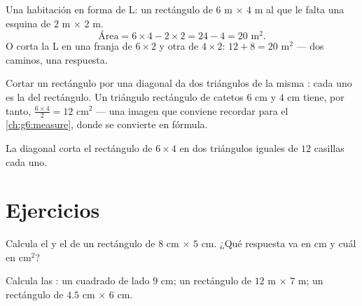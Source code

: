 \begin{example}\label{ex:g5:areas:composite}
Una habitación en forma de L: un rectángulo de $6$ m $\times$ $4$ m al que le falta una
esquina de $2$ m $\times$ $2$ m.
\[
\text{Área} = 6 \times 4 - 2 \times 2 = 24 - 4 = 20 \text{ m}^2 .
\]
O corta la L en una franja de $6 \times 2$ y otra de $4 \times 2$:
$12 + 8 = 20$ m$^2$ --- dos caminos, una respuesta.
\end{example}

\begin{example}\label{ex:g5:areas:halfrect}
Cortar un rectángulo por una diagonal da dos triángulos de la misma
: cada uno es la \emph{} del rectángulo. Un triángulo rectángulo de catetos
$6$ cm y $4$ cm tiene, por tanto,  $\frac{6 \times 4}{2} = 12$
cm$^2$ --- una imagen que conviene recordar para el
\cref{ch:g6:measure}, donde se convierte en fórmula.
\end{example}

\begin{omfigure}

{\small La diagonal corta el rectángulo de $6 \times 4$ en dos triángulos
iguales de $12$ casillas cada uno.}
\end{omfigure}

\section{Ejercicios}

\begin{exercise}[$\star$]\label{exo:g5:areas:1}
Calcula el  y el  de un rectángulo de $8$ cm $\times$
$5$ cm. ¿Qué respuesta va en cm y cuál en cm$^2$?
\end{exercise}

\begin{exercise}[$\star$]\label{exo:g5:areas:2}
Calcula las : un cuadrado de lado $9$ cm; un rectángulo de
$12$ m $\times$ $7$ m; un rectángulo de $4.5$ cm $\times$ $6$ cm.
\end{exercise}

